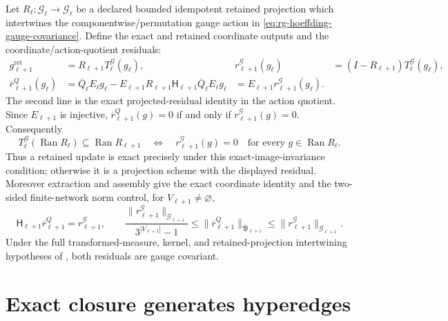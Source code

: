 Let \(R_\ell:\mathcal G_\ell\to\mathcal G_\ell\) be a declared bounded
idempotent retained projection which intertwines the componentwise/permutation
gauge action in \eqref{eq:rg-hoeffding-gauge-covariance}.  Define the exact
and retained coordinate outputs and the coordinate/action-quotient residuals:
\begin{align}
 g_{\ell+1}^{\mathrm{ret}}&=R_{\ell+1}T_\ell^{\mathcal G}(g_\ell),
 &r_{\ell+1}^{\mathcal G}(g_\ell)
 &=(I-R_{\ell+1})T_\ell^{\mathcal G}(g_\ell),
 \label{eq:rg-interaction-coordinate-residual}\\
 \overline r_{\ell+1}^{Q}(g_\ell)
 &=\overline Q_\ell E_\ell g_\ell
 -E_{\ell+1}R_{\ell+1}\mathsf H_{\ell+1}\overline Q_\ell E_\ell g_\ell
 &=E_{\ell+1}r_{\ell+1}^{\mathcal G}(g_\ell).
 \label{eq:rg-interaction-action-residual}
\end{align}
The second line is the exact projected-residual identity in the action
quotient.  Since \(E_{\ell+1}\) is injective,
\(\overline r_{\ell+1}^{Q}(g)=0\) if and only if
\(r_{\ell+1}^{\mathcal G}(g)=0\).  Consequently
\begin{equation}
 T_\ell^{\mathcal G}(\operatorname{Ran}R_\ell)
 \subseteq\operatorname{Ran}R_{\ell+1}
 \quad\Longleftrightarrow\quad
 r_{\ell+1}^{\mathcal G}(g)=0
 \quad\text{for every }g\in\operatorname{Ran}R_\ell.
 \label{eq:rg-interaction-exact-image-invariance}
\end{equation}
Thus a retained update is exact precisely under this exact-image-invariance
condition; otherwise it is a projection scheme with the displayed residual.
Moreover extraction and assembly give the exact coordinate identity and the
two-sided finite-network norm control, for \(V_{\ell+1}\ne\varnothing\),
\begin{equation}
 \mathsf H_{\ell+1}\overline r_{\ell+1}^Q
 =r_{\ell+1}^{\mathcal G},
 \qquad
 \frac{\lVert r_{\ell+1}^{\mathcal G}\rVert_{\mathcal G_{\ell+1}}}
 {3^{|V_{\ell+1}|}-1}
 \leq\lVert\overline r_{\ell+1}^Q\rVert_{\overline{\mathfrak B}_{\ell+1}}
 \leq\lVert r_{\ell+1}^{\mathcal G}\rVert_{\mathcal G_{\ell+1}}.
\label{eq:rg-interaction-residual-norm-control}
\end{equation}
Under the full transformed-measure, kernel, and retained-projection
intertwining hypotheses of
, both residuals are gauge
covariant. 

\section{Exact closure generates hyperedges}
\label{sec:rg-hypergraph-closure}


